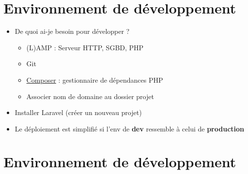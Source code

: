 \hypertarget{environnement-de-duxe9veloppement}{%
\section{Environnement de
développement}\label{environnement-de-duxe9veloppement}}

\begin{itemize}
\tightlist
\item
  De quoi ai-je besoin pour développer ?

  \begin{itemize}
  \tightlist
  \item
    (L)AMP : Serveur HTTP, SGBD, PHP
  \item
    Git
  \item
    \href{https://getcomposer.org/}{Composer} : gestionnaire de
    dépendances PHP
  \item
    Associer nom de domaine au dossier projet
  \end{itemize}
\item
  Installer Laravel (créer un nouveau projet)
\end{itemize}

\begin{english}

\begin{Shaded}
\begin{Highlighting}[]
 
\end{Highlighting}
\end{Shaded}

\end{english}

\begin{itemize}
\tightlist
\item
  Le déploiement est simplifié si l'env de \textbf{dev} ressemble à
  celui de \textbf{production}
\end{itemize}

\hypertarget{environnement-de-duxe9veloppement-1}{%
\section{Environnement de
développement}\label{environnement-de-duxe9veloppement-1}}

